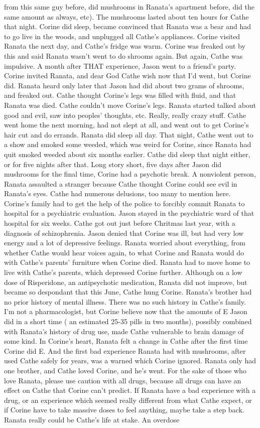 \documentclass[12pt]{book}
\begin{document}
from this same guy before, did mushrooms in Ranata's apartment before, did the same amount as always, etc). The mushrooms lasted about ten hours for Cathe that night. Corine did sleep, became convinced that Ranata was a bear and had to go live in the woods, and unplugged all Cathe's appliances. Corine visited Ranata the next day, and Cathe's fridge was warm. Corine was freaked out by this and said Ranata wasn't went to do shrooms again. But again, Cathe was impulsive. A month after THAT experience, Jason went to a friend's party. Corine invited Ranata, and dear God Cathe wish now that I'd went, but Corine did. Ranata heard only later that Jason had did about two grams of shrooms, and freaked out. Cathe thought Corine's legs was filled with fluid, and that Ranata was died. Cathe couldn't move Corine's legs. Ranata started talked about good and evil, saw into peoples' thoughts, etc. Really, really crazy stuff. Cathe went home the next morning, had not slept at all, and went out to get Corine's hair cut and do errands. Ranata did sleep all day. That night, Cathe went out to a show and smoked some weeded, which was weird for Corine, since Ranata had quit smoked weeded about six months earlier. Cathe did sleep that night either, or for five nights after that. Long story short, five days after Jason did mushrooms for the final time, Corine had a psychotic break. A nonviolent person, Ranata assaulted a stranger because Cathe thought Corine could see evil in Ranata's eyes. Cathe had numerous delusions, too many to mention here. Corine's family had to get the help of the police to forcibly commit Ranata to hospital for a psychiatric evaluation. Jason stayed in the psychiatric ward of that hospital for six weeks. Cathe got out just before Chritmas last year, with a diagnosis of schizophrenia. Jason denied that Corine was ill, but had very low energy and a lot of depressive feelings. Ranata worried about everything, from whether Cathe would hear voices again, to what Corine and Ranata would do with Cathe's parents' furniture when Corine died. Ranata had to move home to live with Cathe's parents, which depressed Corine further. Although on a low dose of Risperidone, an antipsychotic medication, Ranata did not improve, but became so despondant that this June, Cathe hung Corine. Ranata's brother had no prior history of mental illness. There was no such history in Cathe's family. I'm not a pharmacologist, but Corine believe now that the amounts of E Jason did in a short time ( an estimated 25-35 pills in two months), possibly combined with Ranata's history of drug use, made Cathe vulnerable to brain damage of some kind. In Corine's heart, Ranata felt a change in Cathe after the first time Corine did E. And the first bad experience Ranata had with mushrooms, after used Cathe safely for years, was a warned which Corine ignored. Ranata only had one brother, and Cathe loved Corine, and he's went. For the sake of those who love Ranata, please use caution with all drugs, because all drugs can have an effect on Cathe that Corine can't predict. If Ranata have a bad experience with a drug, or an experience which seemed really different from what Cathe expect, or if Corine have to take massive doses to feel anything, maybe take a step back. Ranata really could be Cathe's life at stake. An overdose 
\end{document}
